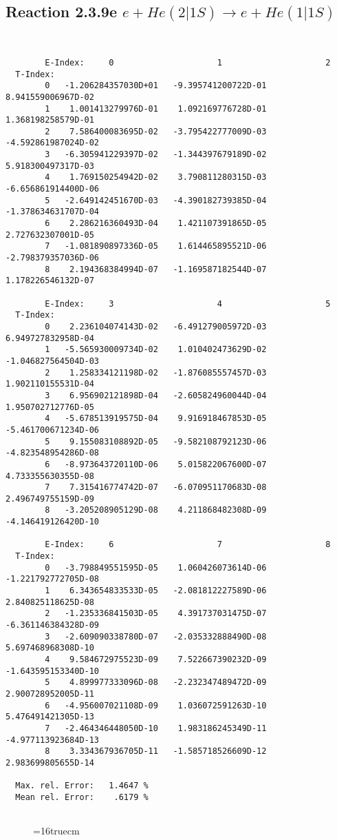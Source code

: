 \documentclass[12pt]{article}
\begin{document}
\subsection{
Reaction 2.3.9e  $e + He(2|1S) \rightarrow e + He(1|1S) $
}


\begin{small}\begin{verbatim}


        E-Index:     0                     1                     2
  T-Index:
        0   -1.206284357030D+01   -9.395741200722D-01    8.941559006967D-02
        1    1.001413279976D-01    1.092169776728D-01    1.368198258579D-01
        2    7.586400083695D-02   -3.795422777009D-03   -4.592861987024D-02
        3   -6.305941229397D-02   -1.344397679189D-02    5.918300497317D-03
        4    1.769150254942D-02    3.790811280315D-03   -6.656861914400D-06
        5   -2.649142451670D-03   -4.390182739385D-04   -1.378634631707D-04
        6    2.286216360493D-04    1.421107391865D-05    2.727632307001D-05
        7   -1.081890897336D-05    1.614465895521D-06   -2.798379357036D-06
        8    2.194368384994D-07   -1.169587182544D-07    1.178226546132D-07

        E-Index:     3                     4                     5
  T-Index:
        0    2.236104074143D-02   -6.491279005972D-03    6.949727832958D-04
        1   -5.565930009734D-02    1.010402473629D-02   -1.046827564504D-03
        2    1.258334121198D-02   -1.876085557457D-03    1.902110155531D-04
        3    6.956902121898D-04   -2.605824960044D-04    1.950702712776D-05
        4   -5.678513919575D-04    9.916918467853D-05   -5.461700671234D-06
        5    9.155083108892D-05   -9.582108792123D-06   -4.823548954286D-08
        6   -8.973643720110D-06    5.015822067600D-07    4.733355630355D-08
        7    7.315416774742D-07   -6.070951170683D-08    2.496749755159D-09
        8   -3.205208905129D-08    4.211868482308D-09   -4.146419126420D-10

        E-Index:     6                     7                     8
  T-Index:
        0   -3.798849551595D-05    1.060426073614D-06   -1.221792772705D-08
        1    6.343654833533D-05   -2.081812227589D-06    2.840825118625D-08
        2   -1.235336841503D-05    4.391737031475D-07   -6.361146384328D-09
        3   -2.609090338780D-07   -2.035332888490D-08    5.697468968308D-10
        4    9.584672975523D-09    7.522667390232D-09   -1.643595153340D-10
        5    4.899977333096D-08   -2.232347489472D-09    2.900728952005D-11
        6   -4.956007021108D-09    1.036072591263D-10    5.476491421305D-13
        7   -2.464346448050D-10    1.983186245349D-11   -4.977113923684D-13
        8    3.334367936705D-11   -1.585718526609D-12    2.983699805655D-14

  Max. rel. Error:   1.4647 %
  Mean rel. Error:    .6179 %


\end{verbatim}\end{small}
\begin{figure} \label{2.3.9e}
\epsfxsize=16truecm
\end{figure}
\newpage
\end{document}

